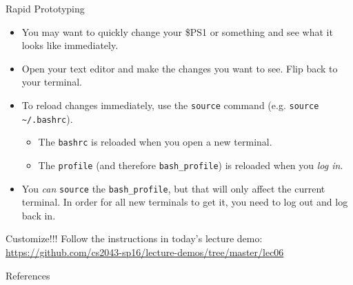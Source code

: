 \begin{frame}[fragile]{Rapid Prototyping}
  \begin{itemize}[<+- | alert@+>]
    \item You may want to quickly change your \$PS1 or something and see what it looks like immediately.
    \item Open your text editor and make the changes you want to see.  Flip back to your terminal.
    \item To reload changes immediately, use the \texttt{source} command (e.g. \texttt{source \textasciitilde/.bashrc}).
    \begin{itemize}[<+- | alert@+>]
      \item The \texttt{bashrc} is reloaded when you open a new terminal.
      \item The \texttt{profile} (and therefore \texttt{bash\_profile}) is reloaded when you \emph{log in}.
    \end{itemize}
    \item You \emph{can} \texttt{source} the \texttt{bash\_profile}, but that will only affect the current terminal.
          In order for all new terminals to get it, you need to log out and log back in.
  \end{itemize}
\end{frame}

\begin{frame}[fragile]{Customize!!!}
  Follow the instructions in today's lecture demo: \href{https://github.com/cs2043-sp16/lecture-demos/tree/master/lec06}{https://github.com/cs2043-sp16/lecture-demos/tree/master/lec06}
\end{frame}

%

\begin{frame}[allowframebreaks]{References}
  
  
\end{frame}


